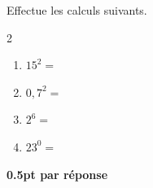 
\question[2]
Effectue les calculs suivants.	

\vspace{10pt}
\setlength{\columnsep}{50pt}
\begin{multicols}{2}
\begin{enumerate}[leftmargin=*,align=parleft, label=\alph*), itemsep=25pt]
\item $15^2 =$ 
\item $0,7^2=$ 
\item $2^6=$ 
\item $23^0=$ 
\end{enumerate}
\end{multicols}
\setlength{\columnsep}{10pt}

\begin{solution}[0pt]
\textbf{0.5pt par réponse}
\end{solution}
